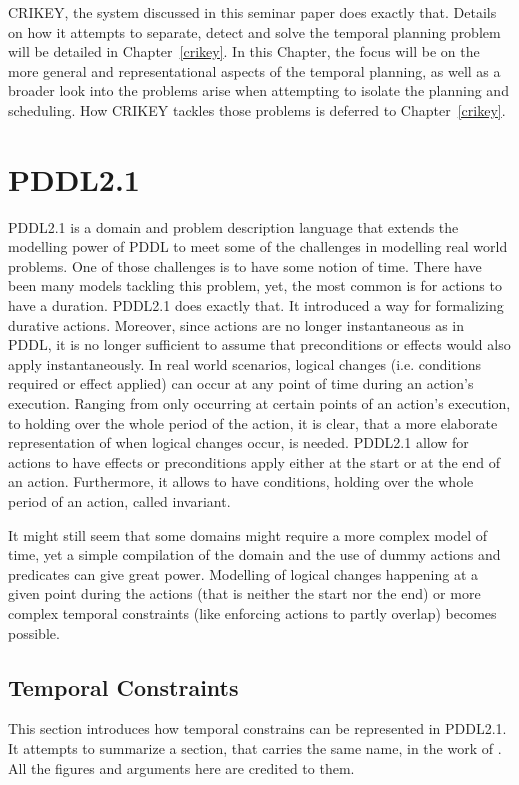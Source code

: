 \documentclass
[a4paper
,english
,parskip=half
,bibliography=totoc
]{scrreprt}
\begin{document}
    CRIKEY, the system discussed in this seminar paper does exactly that. Details on how it attempts to separate, detect and solve the temporal planning problem will be detailed in Chapter~\ref{crikey}. In this Chapter, the focus will be on the more general and representational aspects of the temporal planning, as well as a broader look into the problems arise when attempting to isolate the planning and scheduling. How CRIKEY tackles those problems is deferred to Chapter~\ref{crikey}.  

    
    \section{PDDL2.1} 
    PDDL2.1 \citep{Fox:2003:PEP:1622452.1622454} is a domain and problem description language that extends the modelling power of PDDL \citep{AICPub1821:1998} to meet some of the challenges in modelling real world problems. One of those challenges is to have some notion of time. There have been many models tackling this problem, yet, the most common is for actions to have a duration. PDDL2.1 does exactly that. It introduced a way for formalizing durative actions.
    Moreover, since actions are no longer instantaneous as in PDDL, it is no longer sufficient to assume that preconditions or effects would also apply instantaneously. In real world scenarios, logical changes (i.e. conditions required or effect applied) can occur at any point of time during an action's execution. Ranging from only occurring at certain points of an action's execution, to holding over the whole period of the action, it is clear, that a more elaborate representation of when logical changes occur, is needed. 
    PDDL2.1 allow for actions to have effects or preconditions apply either at the start or at the end of an action. Furthermore, it allows to have conditions, holding over the whole period of an action, called invariant.

    It might still seem that some domains might require a more complex model of time, yet a simple compilation of the domain and the use of dummy actions and predicates can give great power. Modelling of logical changes happening at a given point during the actions (that is neither the start nor the end) or more complex temporal constraints (like enforcing actions to partly overlap) becomes possible.

        \subsection{Temporal Constraints}
        This section introduces how temporal constrains can be represented in PDDL2.1. 
        It attempts to summarize a section, that carries the same name, in the work of \citet{Isolating}. All the figures and arguments here are credited to them.
\end{document}
